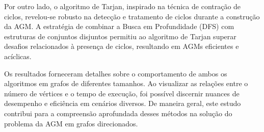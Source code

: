 \documentclass[12pt]{article}
\begin{document}
Por outro lado, o algoritmo de Tarjan, inspirado na técnica de contração de ciclos, revelou-se robusto na detecção e tratamento de ciclos durante a construção da AGM. A estratégia de combinar a Busca em Profundidade (DFS) com estruturas de conjuntos disjuntos permitiu ao algoritmo de Tarjan superar desafios relacionados à presença de ciclos, resultando em AGMs eficientes e acíclicas.

Os resultados forneceram detalhes sobre o comportamento de ambos os algoritmos em grafos de diferentes tamanhos. Ao visualizar as relações entre o número de vértices e o tempo de execução, foi possível discernir nuances de desempenho e eficiência em cenários diversos. De maneira geral, este estudo contribui para a compreensão aprofundada desses métodos na solução do problema da AGM em grafos direcionados.



\end{document}
